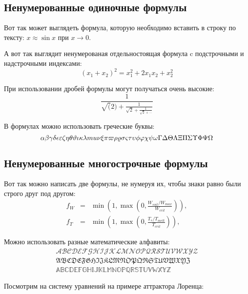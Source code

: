 \subsection{Ненумерованные одиночные формулы} \label{subsect1_3_1}

Вот так может выглядеть формула, которую необходимо вставить в строку по тексту: $x \approx \sin x$ при $x \to 0$.

А вот так выглядит ненумерованая отдельностоящая формула c подстрочными и надстрочными индексами:
$$
(x_1+x_2)^2 = x_1^2 + 2 x_1 x_2 + x_2^2
$$

При использовании дробей формулы могут получаться очень высокие:
$$
  \frac{1}{\sqrt(2)+
  \displaystyle\frac{1}{\sqrt{2}+
  \displaystyle\frac{1}{\sqrt{2}+\cdots}}}
$$

В формулах можно использовать греческие буквы:
$$
\alpha\beta\gamma\delta\epsilon\varepsilon\zeta\eta\theta\vartheta\iota\kappa\lambda\\mu\nu\xi\pi\varpi\rho\varrho\sigma\varsigma\tau\upsilon\phi\varphi\chi\psi\omega\Gamma\Delta\Theta\Lambda\Xi\Pi\Sigma\Upsilon\Phi\Psi\Omega
$$


\subsection{Ненумерованные многострочные формулы} \label{subsect1_3_2}

Вот так можно написать две формулы, не нумеруя их, чтобы знаки равно были строго друг под другом:
\begin{eqnarray}
  f_W & = & \min \left( 1, \max \left( 0, \frac{W_{soil} / W_{max}}{W_{crit}} \right)  \right), \nonumber \\
  f_T & = & \min \left( 1, \max \left( 0, \frac{T_s / T_{melt}}{T_{crit}} \right)  \right), \nonumber
\end{eqnarray}

Можно использовать разные математические алфавиты:
\begin{eqnarray}
\mathcal{ABCDEFGHIJKLMNOPQRSTUVWXYZ} \nonumber \\
\mathfrak{ABCDEFGHIJKLMNOPQRSTUVWXYZ} \nonumber \\
\mathbb{ABCDEFGHIJKLMNOPQRSTUVWXYZ} \nonumber
\end{eqnarray}

Посмотрим на систему уравнений на примере аттрактора Лоренца:

